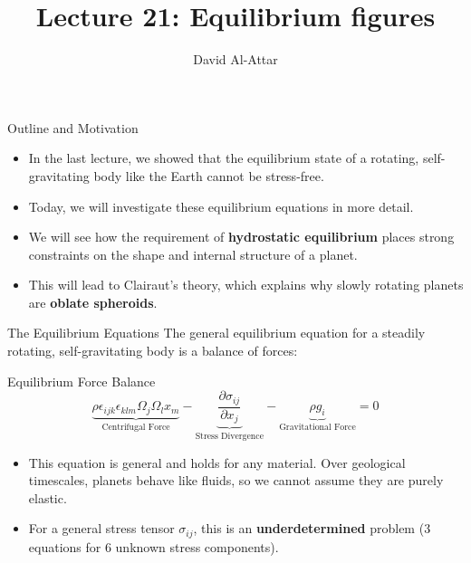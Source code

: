 \documentclass{beamer}
\title[Lecture 21: Equilibrium figures]{Lecture 21: Equilibrium figures}
\author{David Al-Attar}
\institute{Michaelmas term 2024}
\date{}
\begin{document}

\begin{frame}
    \titlepage
\end{frame}

\begin{frame}{Outline and Motivation}
    \begin{itemize}
        \item In the last lecture, we showed that the equilibrium state of a rotating, self-gravitating body like the Earth cannot be stress-free.
        \pause
        \item Today, we will investigate these equilibrium equations in more detail.
        \pause
        \item We will see how the requirement of \textbf{hydrostatic equilibrium} places strong constraints on the shape and internal structure of a planet.
        \pause
        \item This will lead to Clairaut's theory, which explains why slowly rotating planets are \textbf{oblate spheroids}.
    \end{itemize}
\end{frame}


\begin{frame}{The Equilibrium Equations}
    The general equilibrium equation for a steadily rotating, self-gravitating body is a balance of forces:
    \begin{alertblock}{Equilibrium Force Balance}
        $$ \underbrace{\rho\epsilon_{ijk}\epsilon_{klm}\Omega_{j}\Omega_{l}x_{m}}_{\text{Centrifugal Force}} - \underbrace{\frac{\partial\sigma_{ij}}{\partial x_{j}}}_{\text{Stress Divergence}} - \underbrace{\rho g_{i}}_{\text{Gravitational Force}} = 0 $$
    \end{alertblock}
    \pause
    \begin{itemize}
        \item This equation is general and holds for any material. Over geological timescales, planets behave like fluids, so we cannot assume they are purely elastic.
        \pause
        \item For a general stress tensor $\sigma_{ij}$, this is an \textbf{underdetermined} problem (3 equations for 6 unknown stress components).
    \end{itemize}
\end{frame}
\end{document}
